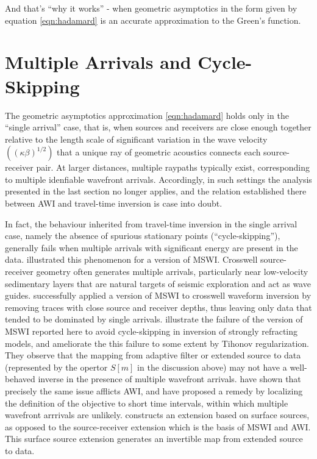 And that's ``why it works'' - when geometric asymptotics in the form
given by equation \ref{eqn:hadamard} is an accurate approximation to the Green's function.

\section{Multiple Arrivals and Cycle-Skipping}
The geometric asymptotics approximation \ref{eqn:hadamard} holds only
in the ``single arrival'' case, that is, when sources and receivers
are close enough together relative to the length scale of significant
variation in the wave velocity $((\kappa\beta)^{1/2})$ that a unique ray of
geometric acoustics connects each source-receiver pair. At larger
distances, multiple raypaths typically exist, corresponding to
multiple idenfiable wavefront arrivals. Accordingly, in such settings
the analysis presented in the last section no longer applies, and the
relation established there between AWI and travel-time inversion is
case into doubt.

In fact, the behaviour inherited from travel-time inversion in the
single arrival case, namely the absence of spurious stationary points
(``cycle-skipping''), generally fails when multiple arrivals with
significant energy are present in the data. \cite{Symes:94c}
illustrated this phenomenon for a version of MSWI. Crosswell
source-receiver geometry often generates multiple arrivals,
particularly near low-velocity sedimentary layers that are natural
targets of seismic exploration and act as wave
guides. \cite{Plessix:00} successfully applied a version of MSWI to
crosswell waveform inversion by removing traces with close source and
receiver depths, thus leaving only data that tended to be dominated by
single arrivals. \cite{HuangSymes:Geo17} illustrate the failure of the
version of MSWI reported here to avoid cycle-skipping in inversion of
strongly refracting models, and ameliorate the this failure to some
extent by Tihonov regularization. They observe that the mapping from
adaptive filter or extended source to data (represented by the opertor
$S[m]$ in the discussion above) may not have a well-behaved inverse in
the presence of multiple wavefront arrivals. \cite{Yongetal:GJI23}
have shown that precisely the same issue afflicts AWI, and have
proposed a remedy by localizing the definition of the objective to
short time intervals, within which multiple wavefront arrrivals are
unlikely. \cite{Symes:23} constructs an extension based on surface
sources, as opposed to the source-receiver extension which is the
basis of MSWI and AWI. This surface source extension generates an
invertible map from extended source to data.

